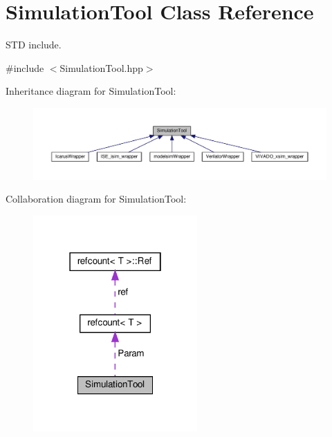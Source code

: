 \hypertarget{classSimulationTool}{}\section{Simulation\+Tool Class Reference}
\label{classSimulationTool}


S\+TD include.  




{\ttfamily \#include $<$Simulation\+Tool.\+hpp$>$}



Inheritance diagram for Simulation\+Tool\+:
\nopagebreak
\begin{figure}[H]
\begin{center}
\leavevmode
\includegraphics[width=350pt]{d8/d87/classSimulationTool__inherit__graph}
\end{center}
\end{figure}


Collaboration diagram for Simulation\+Tool\+:
\nopagebreak
\begin{figure}[H]
\begin{center}
\leavevmode
\includegraphics[width=178pt]{dd/db2/classSimulationTool__coll__graph}
\end{center}
\end{figure}
